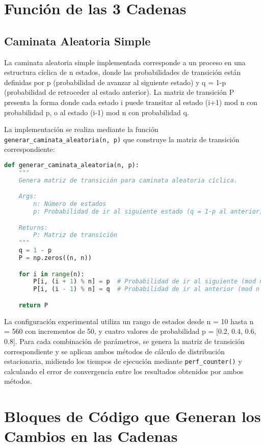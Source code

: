 \section{Función de las 3 Cadenas}

\subsection{Caminata Aleatoria Simple}

La caminata aleatoria simple implementada corresponde a un proceso en una estructura cíclica de n estados, donde las probabilidades de transición están definidas por p (probabilidad de avanzar al siguiente estado) y q = 1-p (probabilidad de retroceder al estado anterior). La matriz de transición P presenta la forma donde cada estado i puede transitar al estado (i+1) mod n con probabilidad p, o al estado (i-1) mod n con probabilidad q.

La implementación se realiza mediante la función \texttt{generar\_caminata\_aleatoria(n, p)} que construye la matriz de transición correspondiente:

\begin{lstlisting}[language=Python]
def generar_caminata_aleatoria(n, p):
    """
    Genera matriz de transición para caminata aleatoria cíclica.

    Args:
        n: Número de estados
        p: Probabilidad de ir al siguiente estado (q = 1-p al anterior)

    Returns:
        P: Matriz de transición
    """
    q = 1 - p
    P = np.zeros((n, n))

    for i in range(n):
        P[i, (i + 1) % n] = p  # Probabilidad de ir al siguiente (mod n para ciclo)
        P[i, (i - 1) % n] = q  # Probabilidad de ir al anterior (mod n para ciclo)

    return P
\end{lstlisting}

La configuración experimental utiliza un rango de estados desde n = 10 hasta n = 560 con incrementos de 50, y cuatro valores de probabilidad p = [0.2, 0.4, 0.6, 0.8]. Para cada combinación de parámetros, se genera la matriz de transición correspondiente y se aplican ambos métodos de cálculo de distribución estacionaria, midiendo los tiempos de ejecución mediante \texttt{perf\_counter()} y calculando el error de convergencia entre los resultados obtenidos por ambos métodos.

\section{Bloques de Código que Generan los Cambios en las Cadenas}

